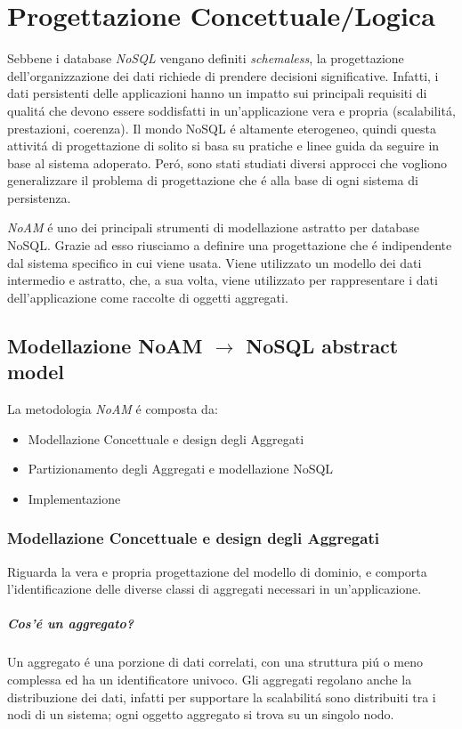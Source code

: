 \chapter{Progettazione Concettuale/Logica}
Sebbene i database \emph{NoSQL} vengano definiti \emph{schemaless}, la progettazione dell'organizzazione dei dati richiede
di prendere decisioni significative. Infatti, i dati persistenti delle applicazioni hanno un impatto sui principali requisiti
di qualitá che devono essere soddisfatti in un'applicazione vera e propria (scalabilitá, prestazioni, coerenza).
Il mondo NoSQL é altamente eterogeneo, quindi questa attivitá di progettazione di solito si basa su pratiche e linee guida da seguire
in base al sistema adoperato. Peró, sono stati studiati diversi approcci che vogliono generalizzare il problema di progettazione
che é alla base di ogni sistema di persistenza.

\emph{NoAM} é uno dei principali strumenti di modellazione astratto per database NoSQL. Grazie ad esso riusciamo a definire
una progettazione che é indipendente dal sistema specifico in cui viene usata. Viene utilizzato un modello dei dati intermedio e astratto,
che, a sua volta, viene utilizzato per rappresentare i dati dell'applicazione come raccolte di oggetti aggregati.
\section{Modellazione NoAM $\to$ NoSQL abstract model}
La metodologia \emph{NoAM} é composta da:
\begin{itemize}
    \item Modellazione Concettuale e design degli Aggregati
    \item Partizionamento degli Aggregati e modellazione NoSQL
    \item Implementazione
\end{itemize}

\subsection{Modellazione Concettuale e design degli Aggregati}
Riguarda la vera e propria progettazione del modello di dominio, e comporta l'identificazione
delle diverse classi di aggregati necessari in un'applicazione.

\paragraph{Cos'é un aggregato?}
Un aggregato é una porzione di dati correlati, con una struttura piú o meno complessa ed ha un identificatore univoco.
Gli aggregati regolano anche la distribuzione dei dati, infatti per supportare la scalabilitá sono distribuiti tra i nodi
di un sistema;
ogni oggetto aggregato si trova su un singolo nodo.\\

